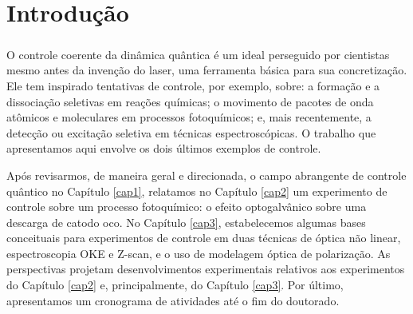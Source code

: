 \chapter*{Introdução}
\paragraph{}

O controle coerente da dinâmica quântica é um ideal perseguido por cientistas mesmo antes da invenção do laser, uma ferramenta básica para sua concretização. Ele tem inspirado tentativas de controle, por exemplo, sobre: a formação e a dissociação seletivas em reações químicas; o movimento de pacotes de onda atômicos e moleculares em processos fotoquímicos; e, mais recentemente, a detecção ou excitação seletiva em técnicas espectroscópicas. O trabalho que  apresentamos aqui envolve os dois últimos exemplos de controle.

Após revisarmos, de maneira geral e direcionada, o campo abrangente de controle quântico no Capítulo \ref{cap1}, relatamos no Capítulo \ref{cap2} um experimento de controle sobre um processo fotoquímico: o efeito optogalvânico sobre uma descarga de catodo oco. No Capítulo \ref{cap3}, estabelecemos algumas bases conceituais para experimentos de controle em duas técnicas de óptica não linear, espectroscopia OKE e Z-scan, e o uso de modelagem óptica de polarização. As perspectivas projetam desenvolvimentos experimentais relativos aos experimentos do Capítulo \ref{cap2} e, principalmente, do Capítulo \ref{cap3}. Por último, apresentamos um cronograma de atividades até o fim do doutorado. 


